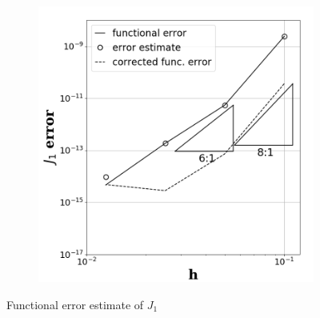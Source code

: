 \documentclass[a4paper]{article}
\begin{document}
\begin{figure}[!htbp]
\begin{subfigure}{0.45\textwidth}
    \label{fig:subsonic_p2_j1}
  \end{subfigure}
  \begin{subfigure}{0.45\textwidth}
    \centering
    \includegraphics[width=1.0\linewidth]{figures/subsonic_p3_J1.png}
    \label{fig:subsonic_p3_j1}
  \end{subfigure}
  \caption{Functional error estimate of $J_1$}
  \label{fig:func_error_J1}
\end{figure}
\end{document}
